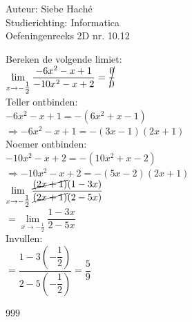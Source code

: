 \documentclass[a4paper]{article}
\begin{document}
\noindent \large Auteur: Siebe Haché \\
\noindent \large Studierichting: Informatica \\
\noindent \large Oefeningenreeks 2D nr. 10.12 \\

\medskip
\normalsize

Bereken de volgende limiet: \\

$ \lim\limits_{x \rightarrow -\tfrac{1}{2}} \dfrac{-6x^2 - x + 1}{-10x^2 - x + 2} = \cancel{\dfrac{0}{0}}$\\

Teller ontbinden: \\

$ -6x^2 - x + 1 = -(6x^2 + x - 1) $ \\

$ \Rightarrow -6x^2 - x + 1 = -(3x - 1)(2x + 1) $ \\

Noemer ontbinden: \\

$ -10x^2 - x + 2 = -(10x^2 + x - 2) $\\

$ \Rightarrow -10x^2 - x + 2 = -(5x - 2)(2x + 1) $\\

$ \lim\limits_{x \rightarrow -\tfrac{1}{2}} \dfrac{\cancel{(2x+1)} (1 - 3x)}{\cancel{(2x+1)} (2 - 5x)} $ \\

$ = \lim\limits_{x \rightarrow -\tfrac{1}{2}} \dfrac{1 - 3x}{2 - 5x} $ \\

Invullen: \\

$ = \dfrac{1 - 3\left(-\dfrac{1}{2}\right)}{2 - 5\left(-\dfrac{1}{2}\right)} = \dfrac{5}{9} $ \\

\begin{thebibliography}{999}
\end{thebibliography}
\end{document}
